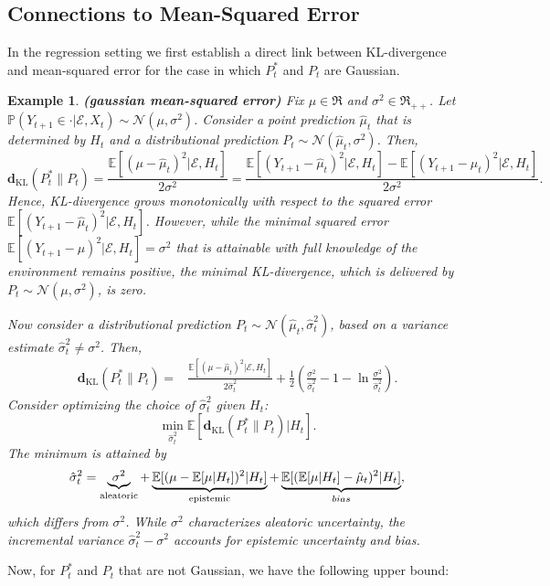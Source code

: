 \documentclass[twoside,11pt]{article}
\newtheorem{example}{Example}
\def\environment{\mathcal{E}}
\def\KL{\mathbf{d}_{\mathrm{KL}}}
\def\E{\mathbb{E}}
\def\Pr{\mathbb{P}}
\begin{document}
\subsection{Connections to Mean-Squared Error}
\label{sec:conn-mean-squar-err}
In the regression setting we first establish a direct link between KL-divergence and mean-squared error for the case in which $P^*_t$ and $P_t$ are Gaussian.
\begin{example}
    {\bf (gaussian mean-squared error)}
    \label{ex:guass_mse}
    Fix $\mu \in \Re$ and $\sigma^2 \in \Re_{++}$.  Let $\Pr(Y_{t+1}\in\cdot | \environment, X_t) \sim \mathcal{N}(\mu, \sigma^2)$.  Consider a point prediction $\hat{\mu}_t$ that is determined by $H_t$ and a distributional prediction $P_t \sim \mathcal{N}(\hat{\mu}_t, \sigma^2)$.  Then,
    $$\KL(P^*_t \| P_t) = \frac{\E[(\mu - \hat{\mu}_t)^2 | \environment, H_t]}{2 \sigma^2} 
    = \frac{\E[(Y_{t+1} - \hat{\mu}_t)^2 | \environment, H_t] - \E[(Y_{t+1} - \mu_t)^2 | \environment, H_t]}{2 \sigma^2}.$$
    Hence, KL-divergence grows monotonically with respect to the squared error $\E[(Y_{t+1} - \hat{\mu}_t)^2 | \environment, H_t]$.  However, while the minimal squared error $\E[(Y_{t+1} - \mu)^2 | \environment, H_t] = \sigma^2$ that is attainable with full knowledge of the environment remains positive, the minimal KL-divergence, which is delivered by $P_t \sim \mathcal{N}(\mu, \sigma^2)$, is zero.
    
    Now consider a distributional prediction $P_t \sim \mathcal{N}(\hat{\mu}_t, \hat{\sigma}_t^2)$, based on a variance estimate $\hat{\sigma}_t^2 \neq \sigma^2$.  Then,
    \begin{align*}
        \KL(P^*_t \| P_t)
        =& \frac{\E[(\mu - \hat{\mu}_t)^2 | \environment, H_t]}{2 \hat{\sigma}_t^2} + \frac{1}{2} \left(\frac{\sigma^2}{\hat{\sigma}_t^2} - 1 - \ln \frac{\sigma^2}{\hat{\sigma}^2_t}\right).
    \end{align*}
    Consider optimizing the choice of $\hat{\sigma}^2_t$ given $H_t$:
    $$\min_{\hat{\sigma}^2_t} \E[\KL(P^*_t \| P_t) | H_t].$$
    The minimum is attained by
    $$\hat{\sigma}^2_t = \underbrace{\sigma^2}_{\rm aleatoric}  + \underbrace{\E[(\mu - \E[\mu|H_t])^2 | H_t]}_{\rm epistemic} + \underbrace{\E[(\E[\mu|H_t] - \hat{\mu}_t)^2 | H_t]}_{bias},$$
    which differs from $\sigma^2$.  While $\sigma^2$ characterizes aleatoric uncertainty, the incremental variance $\hat{\sigma}^2_t - \sigma^2$ accounts for epistemic uncertainty and bias.
\end{example}
Now, for $P_t^*$ and $P_t$ that are not Gaussian, we have the following upper bound:
\end{document}
